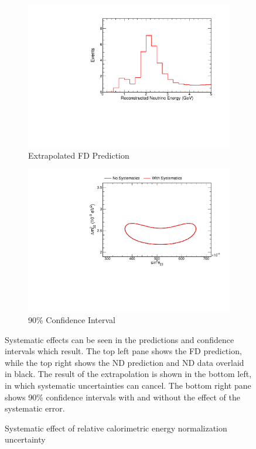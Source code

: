 {\begin{figure}
\begin{center}
\begin{subfigure}[c]{0.49\textwidth}
\includegraphics[width=\textwidth]{figures/systs/prediction/fd_extrap_prediction_calNormRel.pdf}
\caption*{Extrapolated FD Prediction}
\end{subfigure}
\begin{subfigure}[c]{0.49\textwidth}
\includegraphics[width=\textwidth]{figures/systs/prediction/fd_extrap_contour_calNormRel.pdf}
\caption*{90\% Confidence Interval}
\end{subfigure}
\end{center}
\caption{Systematic effect of relative calorimetric energy normalization uncertainty}{
Systematic effects can be seen in the predictions and confidence intervals
which result.
The top left pane shows the FD prediction, while the top right shows the
ND prediction and ND data overlaid in black.
The result of the extrapolation is shown in the bottom left, in which
systematic uncertainties can cancel.
The bottom right pane shows 90\% confidence intervals with and without
the effect of the systematic error.}
\label{syst_fig_calNormRel}


\end{figure}}
